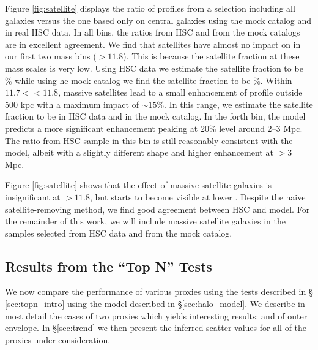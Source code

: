 \documentclass[a4paper,fleqn,usenatbib]{mnras}
\begin{document}
    Figure \ref{fig:satellite} displays the ratio of \dsigma{} profiles from a selection
    including all galaxies versus the one based only on central galaxies using the mock catalog
    and in real HSC data. In all \mmax{} bins, the ratios from HSC and from the mock catalogs are
    in excellent agreement. We find that satellites have almost no impact on \dsigma{} in our
    first two mass bins (\logmmax{}$>11.8$). This is because the satellite fraction at these mass
    scales is very low. Using HSC data we estimate the satellite fraction to be \% while
    using he mock catalog we find the satellite fraction to be \%. Within $11.7
    <$\logmmax{}$<11.8$, massive satellites lead to a small enhancement of \dsigma{} profile
    outside 500 kpc with a maximum impact of $\sim 15$\%. In this \mmax{} range, we estimate the
    satellite fraction to be  in HSC data and  in the mock catalog. In the
    forth \mmax{} bin, the  model predicts a more significant enhancement peaking at 20\%
    level around 2--3 Mpc. The ratio from HSC sample in this bin is still reasonably consistent
    with the model, albeit with a slightly different shape and higher enhancement at $>3$ Mpc.
            
    Figure \ref{fig:satellite} shows that the effect of massive satellite galaxies is insignificant
    at \logmmax{}$>11.8$, but starts to become visible at lower \mmax{}.
    Despite the naive satellite-removing method, we find good agreement between HSC and
    model. For the remainder of this work, we will include massive satellite galaxies in the 
    samples selected from HSC data and from the mock catalog.

\subsection{Results from the ``Top N'' Tests}
    \label{sec:topn_results}

    We now compare the performance of various proxies using the \topn{} tests described in \S
    \ref{sec:topn_intro} using the model described in \S \ref{sec:halo_model}. We describe in
    most detail the cases of two proxies which yields interesting results: \mcmodel{} and
    \mstar{} of outer envelope. In \S \ref{sec:trend} we then present the inferred scatter values
    for all of the proxies under consideration.
\end{document}
